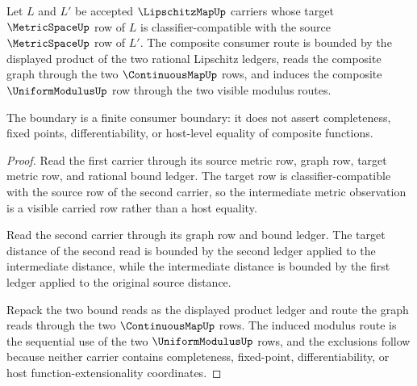 \begin{theorem}
\label{thm:lipschitz-map-composition-boundary}
Let $L$ and $L'$ be accepted $\LipschitzMapUp$ carriers whose target
$\MetricSpaceUp$ row of $L$ is classifier-compatible with the source
$\MetricSpaceUp$ row of $L'$. The composite consumer route is bounded by the
displayed product of the two rational Lipschitz ledgers, reads the composite
graph through the two $\ContinuousMapUp$ rows, and induces the composite
$\UniformModulusUp$ row through the two visible modulus routes.

The boundary is a finite consumer boundary: it does not assert completeness,
fixed points, differentiability, or host-level equality of composite functions.
\end{theorem}
\begin{proof}
Read the first carrier through its source metric row, graph row, target metric
row, and rational bound ledger. The target row is classifier-compatible with the
source row of the second carrier, so the intermediate metric observation is a
visible carried row rather than a host equality.

Read the second carrier through its graph row and bound ledger. The target
distance of the second read is bounded by the second ledger applied to the
intermediate distance, while the intermediate distance is bounded by the first
ledger applied to the original source distance.

Repack the two bound reads as the displayed product ledger and route the graph
reads through the two $\ContinuousMapUp$ rows. The induced modulus route is the
sequential use of the two $\UniformModulusUp$ rows, and the exclusions follow
because neither carrier contains completeness, fixed-point, differentiability,
or host function-extensionality coordinates.
\end{proof}

